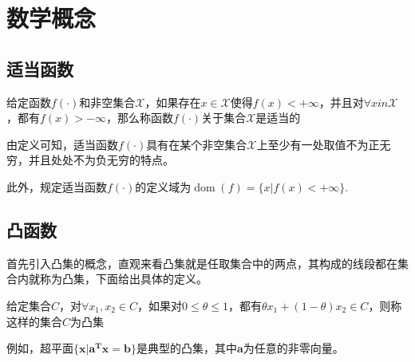 \section{数学概念}

\subsection{适当函数}
\begin{definition}
    给定函数$f(\cdot)$和非空集合$\mathcal{X}$，如果存在$x\in \mathcal{X}$使得$f(x)< +\infty$，并且对$\forall x in \mathcal{X}$，都有$f(x) > -\infty$，那么称函数$f(\cdot)$关于集合$\mathcal{X}$是适当的
\end{definition}

由定义可知，适当函数$f(\cdot)$具有在某个非空集合$\mathcal{X}$上至少有一处取值不为正无穷，并且处处不为负无穷的特点。

此外，规定适当函数$f(\cdot)$的定义域为$\mathop{\mathrm{dom}} (f) = \{x | f(x) < +\infty\}$.

\subsection{凸函数}
首先引入凸集的概念，直观来看凸集就是任取集合中的两点，其构成的线段都在集合内就称为凸集，下面给出具体的定义。

\begin{definition}
    给定集合$C$，对$\forall x_{1}, x_{2}\in C$，如果对$0 \leq \theta \leq 1$，都有$\theta x_{1}+(1-\theta)x_{2}\in C$，则称这样的集合$C$为凸集
\end{definition}

例如，超平面$\{\bm{x}|\bm{a^{T}}\bm{x}=\bm{b}\}$是典型的凸集，其中$\bm{a}$为任意的非零向量。

